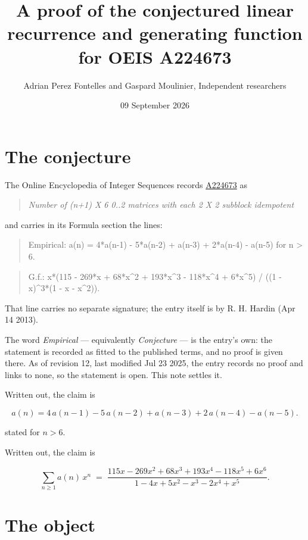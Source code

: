 \documentclass[11pt]{article}
\title{A proof of the conjectured linear recurrence and generating function for OEIS A224673}
\author{Adrian Perez Fontelles and Gaspard Moulinier, Independent researchers}
\date{09 September 2026}
\theoremstyle{definition}
\begin{document}
\maketitle
\section{The conjecture}

The Online Encyclopedia of Integer Sequences records \href{https://oeis.org/A224673}{A224673} as

\begin{quote}\itshape Number of (n+1) X 6 0..2 matrices with each 2 X 2 subblock idempotent\end{quote}

and carries in its Formula section the lines:

\begin{quote}\ttfamily Empirical: a(n) = 4*a(n-1) - 5*a(n-2) + a(n-3) + 2*a(n-4) - a(n-5) for n > 6.\end{quote}

\begin{quote}\ttfamily G.f.: x*(115 - 269*x + 68*x\textasciicircum{}2 + 193*x\textasciicircum{}3 - 118*x\textasciicircum{}4 + 6*x\textasciicircum{}5) / ((1 - x)\textasciicircum{}3*(1 - x - x\textasciicircum{}2)).\end{quote}

That line carries no separate signature; the entry itself is by R. H. Hardin (Apr 14 2013).

The word {\itshape Empirical} --- equivalently {\itshape Conjecture} --- is the entry's own: the statement is recorded as fitted to the published terms, and no proof is given there. As of revision 12, last modified Jul 23 2025, the entry records no proof and links to none, so the statement is open. This note settles it.

Written out, the claim is

\[a(n) = 4\,a(n-1) - 5\,a(n-2) + a(n-3) + 2\,a(n-4) - a(n-5).\]

stated for $n > 6$.

Written out, the claim is

\[\sum_{n \ge 1} a(n)\,x^n \;=\; \frac{115x - 269x^{2} + 68x^{3} + 193x^{4} - 118x^{5} + 6x^{6}}{1 - 4x + 5x^{2} - x^{3} - 2x^{4} + x^{5}}.\]

\section{The object}
\end{document}
